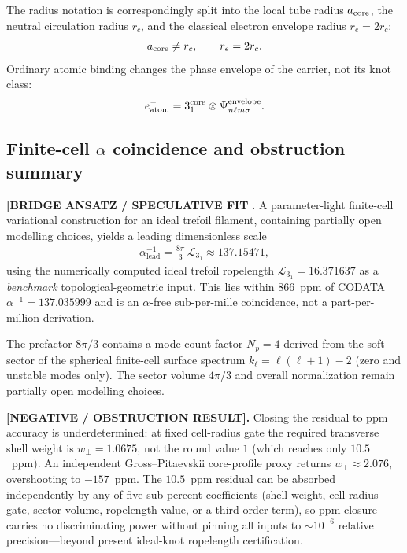 \documentclass[11pt]{article}
\theoremstyle{definition}
\theoremstyle{plain}
\theoremstyle{remark}
\newcommand{\rc}{{r_c}}
\begin{document}
            The radius notation is correspondingly split into the local tube
            radius \(a_{\rm core}\), the neutral circulation radius \(\rc\), and
            the classical electron envelope radius \(r_e=2\rc\):
            \begin{align}
                a_{\rm core} \neq \rc,
                \qquad
                r_e=2\rc .
            \end{align}
            Ordinary atomic binding changes the phase envelope of the carrier,
            not its knot class:
            \begin{align}
                e^-_{\rm atom}
                =
                3_1^{\rm core}\otimes\Psi_{n\ell m\sigma}^{\rm envelope} .
            \end{align}


        \subsection{Finite-cell $\alpha$ coincidence and obstruction summary}
            \label{subsec:finite_cell_alpha_obstruction}

            \textbf{[BRIDGE ANSATZ / SPECULATIVE FIT].}
            A parameter-light finite-cell variational construction for an ideal trefoil filament,
            containing partially open modelling choices, yields a leading dimensionless scale
            \begin{align}
                \alpha^{-1}_{\mathrm{lead}}
                =
                \frac{8\pi}{3}\,\mathcal{L}_{3_1}
                \approx 137.15471,
                \label{eq:alpha_lead_finite_cell}
            \end{align}
            using the numerically computed ideal trefoil ropelength
            $\mathcal{L}_{3_1}=16.371637$ as a \emph{benchmark} topological-geometric input.
            This lies within $866$~ppm of CODATA $\alpha^{-1}=137.035999$ and is an
            $\alpha$-free sub-per-mille coincidence, not a part-per-million derivation.

            The prefactor $8\pi/3$ contains a mode-count factor $N_p=4$ derived from the
            soft sector of the spherical finite-cell surface spectrum
            $k_\ell=\ell(\ell+1)-2$ (zero and unstable modes only). The sector volume
            $4\pi/3$ and overall normalization remain partially open modelling choices.

            \textbf{[NEGATIVE / OBSTRUCTION RESULT].}
            Closing the residual to ppm accuracy is underdetermined: at fixed cell-radius
            gate the required transverse shell weight is $w_\perp=1.0675$, not the round
            value $1$ (which reaches only $10.5$~ppm). An independent Gross--Pitaevskii
            core-profile proxy returns $w_\perp\approx 2.076$, overshooting to $-157$~ppm.
            The $10.5$~ppm residual can be absorbed independently by any of five
            sub-percent coefficients (shell weight, cell-radius gate, sector volume,
            ropelength value, or a third-order term), so ppm closure carries no
            discriminating power without pinning all inputs to $\sim10^{-6}$ relative
            precision---beyond present ideal-knot ropelength certification.
\end{document}
